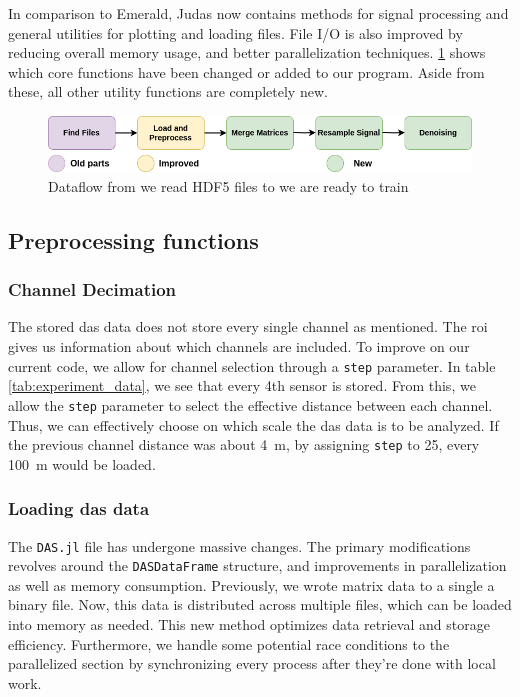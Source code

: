 In comparison to Emerald, Judas now contains methods for signal processing and general utilities for plotting and loading files. File I/O is also improved by reducing overall memory usage, and better parallelization techniques.
\ref{fig:apiflow} shows which core functions have been changed or added to our program. Aside from these, all other utility functions are completely new. \\

\begin{figure}[!h]
    \centering
    \includegraphics[scale=0.5]{figures/dataflow.png}
    \caption{Dataflow from we read HDF5 files to we are ready to train}
    \label{fig:apiflow}
\end{figure}


\subsection{Preprocessing functions}

\subsubsection{Channel Decimation}

The stored \acrshort{das} data does not store every single channel as mentioned. The \acrfull{roi} gives us information about which channels are included. To improve on our current code, we allow for channel selection through a \texttt{step} parameter. In table \ref{tab:experiment_data}, we see that every 4th sensor is stored. From this, we allow the \texttt{step} parameter to select the effective distance between each channel. Thus, we can effectively choose on which scale the \acrshort{das} data is to be analyzed. If the previous channel distance was about \qty{4}{\meter}, by assigning \texttt{step} to 25, every \qty{100}{\meter} would be loaded. \\

\subsubsection{Loading \acrshort{das} data}

The \texttt{DAS.jl} file has undergone massive changes. The primary modifications revolves around the \texttt{DASDataFrame} structure, and improvements in parallelization as well as memory consumption. Previously, we wrote matrix data to a single a binary file. Now, this data is distributed across multiple files, which can be loaded into memory as needed. This new method optimizes data retrieval and storage efficiency. Furthermore, we handle some potential race conditions to the parallelized section by synchronizing every process after they're done with local work. 


